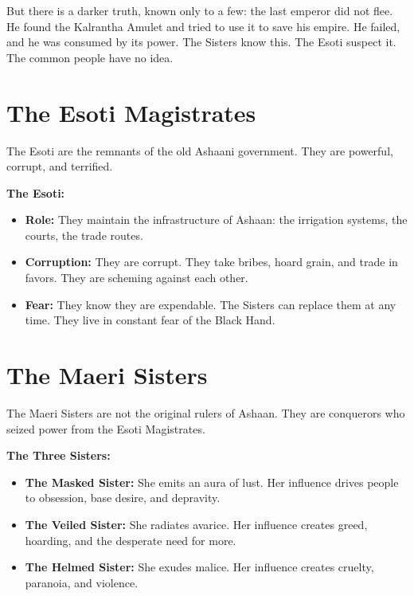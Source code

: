 \documentclass[11pt,twoside]{book}
\newenvironment{mechanicbox}{\begin{mdframed}[style=mechanicbox]}{\end{mdframed}}
\begin{document}
\noindent But there is a darker truth, known only to a few: the last emperor did not flee. He found the Kalrantha Amulet and tried to use it to save his empire. He failed, and he was consumed by its power. The Sisters know this. The Esoti suspect it. The common people have no idea.

\section{The Esoti Magistrates}

The Esoti are the remnants of the old Ashaani government. They are powerful, corrupt, and terrified.

\begin{mechanicbox}
\textbf{The Esoti:}
\begin{itemize}
    \item \textbf{Role:} They maintain the infrastructure of Ashaan: the irrigation systems, the courts, the trade routes.
    \item \textbf{Corruption:} They are corrupt. They take bribes, hoard grain, and trade in favors. They are scheming against each other.
    \item \textbf{Fear:} They know they are expendable. The Sisters can replace them at any time. They live in constant fear of the Black Hand.
\end{itemize}
\end{mechanicbox}

\section{The Maeri Sisters}

The Maeri Sisters are not the original rulers of Ashaan. They are conquerors who seized power from the Esoti Magistrates.

\begin{mechanicbox}
\textbf{The Three Sisters:}
\begin{itemize}
    \item \textbf{The Masked Sister:} She emits an aura of lust. Her influence drives people to obsession, base desire, and depravity.
    \item \textbf{The Veiled Sister:} She radiates avarice. Her influence creates greed, hoarding, and the desperate need for more.
    \item \textbf{The Helmed Sister:} She exudes malice. Her influence creates cruelty, paranoia, and violence.
\end{itemize}
\end{mechanicbox}
\end{document}
